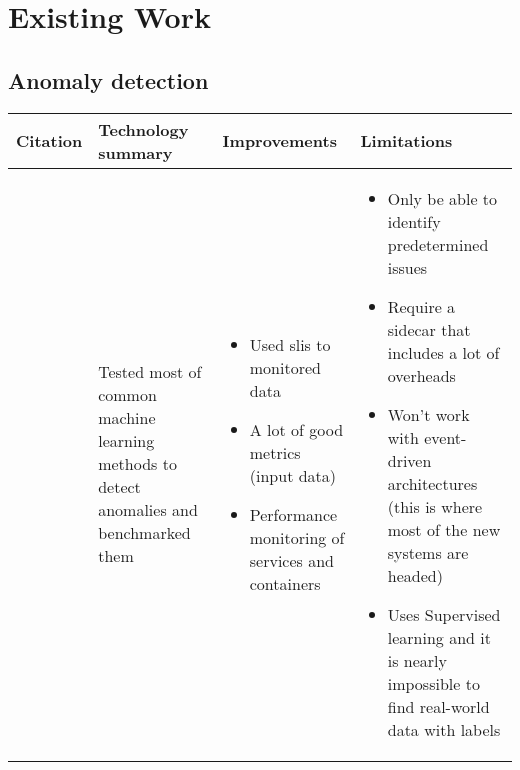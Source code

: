 \section{Existing Work}

\subsection{Anomaly detection}

\begin{longtable}{| p{20mm} | p{43mm} | p{43mm} | p{43mm} |}
\hline
  \textbf{Citation} &
  \textbf{Technology summary} &
  \textbf{Improvements} &
  \textbf{Limitations} \\ \hline


  \cite{du2018anomaly} &
  Tested most of common machine learning methods to detect anomalies and benchmarked them &
  \vspace{-8mm}
  \begin{itemize}[leftmargin=*,noitemsep,nolistsep] 
    \item Used \acp{sli} to monitored data
    \item A lot of good metrics (input data)
    \item Performance monitoring of services and containers
  \vspace{-7mm}
  \end{itemize} &
  \vspace{-8mm}
  \begin{itemize}[leftmargin=*,noitemsep,nolistsep] 
    \item Only be able to identify predetermined issues
    \item Require a sidecar that includes a lot of overheads
    \item Won't work with event-driven architectures (this is where most of the new systems are headed)
    \item Uses Supervised learning and it is nearly impossible to find real-world data with labels
  \vspace{-7mm}
  \end{itemize} \\ \hline



\end{longtable}
